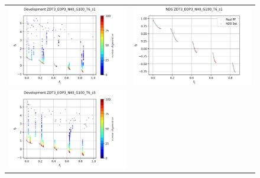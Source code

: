 \begin{figure}[H]
    \centering
    \begin{tabular}{c c}
    \includegraphics[scale=0.5]{figures/ZDT3_EOP3_N40_G100_T6/s1_dev.png} &
    \includegraphics[scale=0.5]{figures/ZDT3_EOP3_N40_G100_T6/s1_nds.png}\\
    \includegraphics[scale=0.5]{figures/ZDT3_EOP3_N40_G100_T6/s5_dev.png} &

\end{tabular}
\end{figure}
